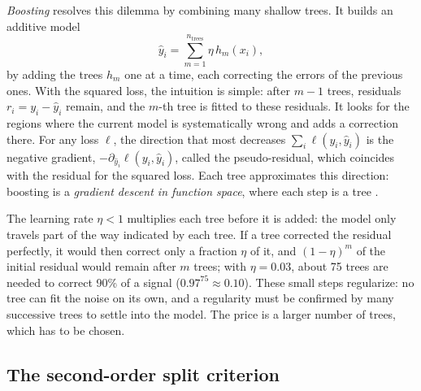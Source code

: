 \documentclass[11pt,a4paper]{article}
\begin{document}
\emph{Boosting} resolves this dilemma by combining many shallow trees. It builds an additive model
\[
\hat y_i = \sum_{m=1}^{n_{\text{trees}}} \eta\, h_m(x_i),
\]
by adding the trees $h_m$ one at a time, each correcting the errors of the previous ones. With the squared loss, the
intuition is simple: after $m - 1$ trees, residuals $r_i = y_i - \hat y_i$ remain, and the $m$-th tree is fitted to
these residuals. It looks for the regions where the current model is systematically wrong and adds a correction
there. For any loss $\ell$, the direction that most decreases $\sum_i \ell(y_i, \hat y_i)$ is the negative gradient,
$-\partial_{\hat y_i}\ell(y_i, \hat y_i)$, called the pseudo-residual, which coincides with the residual for the squared
loss. Each tree approximates this direction: boosting is a \emph{gradient descent in function space}, where each step
is a tree \citep{friedman2001}.

The learning rate $\eta < 1$ multiplies each tree before it is added: the model only travels part of the way indicated
by each tree. If a tree corrected the residual perfectly, it would then correct only a fraction $\eta$ of it, and
$(1 - \eta)^m$ of the initial residual would remain after $m$ trees; with $\eta = 0.03$, about 75 trees are needed to
correct 90\% of a signal ($0.97^{75} \approx 0.10$). These small steps regularize: no tree can fit the noise on its
own, and a regularity must be confirmed by many successive trees to settle into the model. The price is a larger
number of trees, which has to be chosen.

\subsection{The second-order split criterion}\label{sec:split_criterion}
\end{document}
